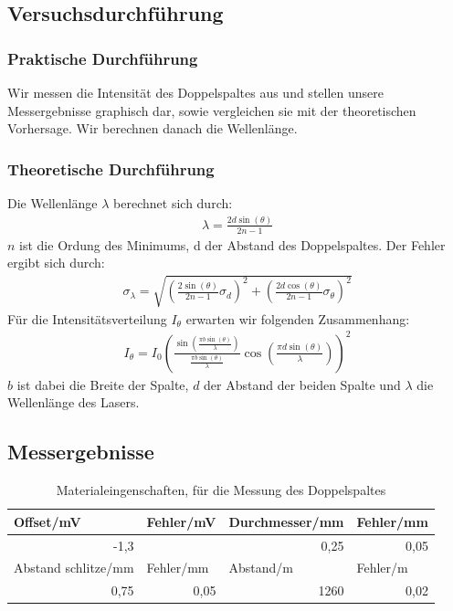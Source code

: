 \documentclass[12pt]{scrartcl}
\begin{document}
\subsection{Versuchsdurchführung}

\subsubsection{Praktische Durchführung}
Wir messen die Intensität des Doppelspaltes aus und stellen unsere Messergebnisse graphisch dar, sowie vergleichen sie mit der theoretischen Vorhersage. Wir berechnen danach die Wellenlänge.
\subsubsection{Theoretische Durchführung}
Die Wellenlänge $\lambda$ berechnet sich durch:
\begin{align}
\lambda = \frac{2d \sin(\theta)}{2n-1}
\label{eqn:lambda_2}
\end{align}
$n$ ist die Ordung des Minimums, d der Abstand des Doppelspaltes.
Der Fehler ergibt sich durch:
\begin{align}
\sigma_\lambda = \sqrt{
\left(\frac{2 \sin(\theta)}{2n-1}\sigma_d\right)^2+
\left(\frac{2d \cos(\theta)}{2n-1}\sigma_\theta\right)^2}
\label{eqn:lambda_2_sigma}
\end{align}
Für die Intensitätsverteilung $I_\theta$ erwarten wir folgenden Zusammenhang:
\begin{align}
I_\theta = I_0\left(\frac{\sin\left(\frac{\pi b \sin(\theta)}{\lambda}\right)}{\frac{\pi b \sin(\theta)}{\lambda}}\cos\left(\frac{\pi d\sin(\theta)}{\lambda}\right)\right)^2
\end{align}
$b$ ist dabei die Breite der Spalte, $d$ der Abstand der beiden Spalte und $\lambda$ die Wellenlänge des Lasers.

\subsection{Messergebnisse}

\begin{table}[htbp]
\caption{Materialeingenschaften, für die Messung des Doppelspaltes}
\begin{center}
\begin{tabular}{|l|l|l|l|}
\hline
Offset/mV & Fehler/mV & Durchmesser/mm & Fehler/mm \\ \hline
\multicolumn{1}{|r|}{-1,3} &  & \multicolumn{1}{r|}{0,25} & \multicolumn{1}{r|}{0,05} \\ \hline
Abstand schlitze/mm & Fehler/mm & Abstand/m & Fehler/m \\ \hline
\multicolumn{1}{|r|}{0,75} & \multicolumn{1}{r|}{0,05} & \multicolumn{1}{r|}{1260} & \multicolumn{1}{r|}{0,02} \\ \hline
\end{tabular}
\end{center}
\label{tab:a_3_e}
\end{table}
\end{document}
